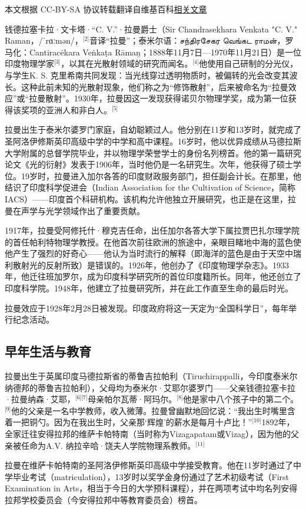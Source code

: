 
本文根据 CC-BY-SA 协议转载翻译自维基百科\href{https://en.wikipedia.org/wiki/C._V._Raman}{相关文章}

钱德拉塞卡拉·文卡塔·“C. V.”·拉曼爵士（Sir Chandrasekhara Venkata "C. V." Raman，/ˈrɑːmən/，\(^\text{[2]}\)音译“拉曼”；泰米尔语：சந்திரசேகர வெங்கட ராமன்，罗马化：Cantiracēkara Veṅkaṭa Rāmaṉ；1888年11月7日—1970年11月21日）是一位印度物理学家\(^\text{[3]}\)，以其在光散射领域的研究而闻名。\(^\text{[4]}\)他使用自己研制的分光仪，与学生K. S. 克里希南共同发现：当光线穿过透明物质时，被偏转的光会改变其波长。这种此前未知的光散射现象，他们称之为“修饰散射”，后来被命名为“拉曼效应”或“拉曼散射”。1930年，拉曼因这一发现获得诺贝尔物理学奖，成为第一位获得该奖项的亚洲人和非白人。\(^\text{[5]}\)

拉曼出生于泰米尔婆罗门家庭，自幼聪颖过人。他分别在11岁和13岁时，就完成了圣阿洛伊修斯英印高级中学的中学和高中课程。16岁时，他以优异成绩从马德拉斯大学附属的总督学院毕业，并以物理学荣誉学士的身份名列榜首。他的第一篇研究论文《光的衍射》发表于1906年，当时他仍是一名研究生。次年，他获得了硕士学位。19岁时，拉曼进入加尔各答的印度财政服务部门，担任副会计长。在那里，他结识了印度科学促进会（Indian Association for the Cultivation of Science，简称 IACS）——印度首个科研机构。该机构允许他独立开展研究，也正是在这里，拉曼在声学与光学领域作出了重要贡献。

1917年，拉曼受阿修托什·穆克吉任命，出任加尔各答大学下属拉贾巴扎尔理学院的首任帕利特物理学教授。在他首次前往欧洲的旅途中，亲眼目睹地中海的蓝色使他产生了强烈的好奇心——他认为当时流行的解释（即海洋的蓝色是由于天空中瑞利散射光的反射所致）是错误的。1926年，他创办了《印度物理学杂志》。1933年，他迁往班加罗尔，成为印度科学研究所的首位印度籍所长。同年，他还创立了印度科学院。1948年，他建立了拉曼研究所，并在此工作直至生命的最后时光。

拉曼效应于1928年2月28日被发现。印度政府将这一天定为“全国科学日”，每年举行纪念活动。
\subsection{早年生活与教育}
拉曼出生于英属印度马德拉斯省的蒂鲁吉拉帕利（Tiruchirappalli，今印度泰米尔纳德邦的蒂鲁吉拉帕利），父母均为泰米尔·艾耶尔婆罗门——父亲钱德拉塞卡拉·拉曼纳森·艾耶，\(^\text{[6][7]}\)母亲帕尔瓦蒂·阿玛尔。\(^\text{[8]}\)他是家中八个孩子中的第二个。\(^\text{[9]}\)他的父亲是一名中学教师，收入微薄。拉曼曾幽默地回忆说：“我出生时嘴里含着一把铜勺。因为在我出生时，父亲那‘辉煌’的薪水是每月十卢比！”\(^\text{[10]}\)1892年，全家迁往安得拉邦的维萨卡帕特南（当时称为Vizagapatam或Vizag），因为他的父亲被任命为A.V. 纳拉辛哈·饶夫人学院物理系教师。\(^\text{[11]}\)

拉曼在维萨卡帕特南的圣阿洛伊修斯英印高级中学接受教育。他在11岁时通过了中学毕业考试（matriculation），13岁时以奖学金身份通过了艺术初级考试（First Examination in Arts，相当于今日的大学预科课程），并在两项考试中均名列安得拉邦学校委员会（今安得拉邦中等教育委员会）榜首。

